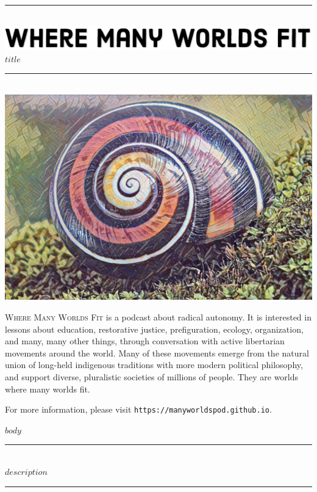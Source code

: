 \documentclass[12pt]{article}
\def\blankpage{\clearpage\thispagestyle{empty}\null\clearpage}
\newcommand{\HRule}{\rule{\linewidth}{0.5mm}}
\begin{document}
\begin{titlepage}
    \centering
    \null
    \vfill
    \HRule \\[0.5cm]
    \includegraphics{../assets/img/banner.jpg} \\[0.6cm]
    {\Huge $title$} \\[0.2cm]
    \HRule \\[3cm]
    \includegraphics{../assets/img/snail.jpg}
    \vfill
\end{titlepage}

\thispagestyle{empty}
\setcounter{page}{2}
\vspace*{6cm}
\textsc{Where Many Worlds Fit} is a podcast about radical autonomy. It is
interested in lessons about education, restorative justice, prefiguration,
ecology, organization, and many, many other things, through conversation
with active libertarian movements around the world. Many of these movements
emerge from the natural union of long-held indigenous traditions with more
modern political philosophy, and support diverse, pluralistic societies of
millions of people. They are worlds where many worlds fit.

For more information, please visit \texttt{https://manyworldspod.github.io}.
\clearpage

\thispagestyle{empty}
\tableofcontents
\clearpage
\blankpage

$body$

\clearpage
\checkoddpage
\ifoddpage
    \blankpage
\fi
\thispagestyle{empty}
\vspace*{6cm}
\noindent\HRule \\[0.5cm]
\textit{\large $description$} \\[0.3cm]
\HRule
\end{document}
